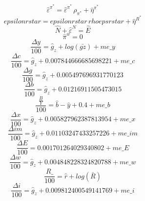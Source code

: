 \begin{dmath}
{\hat{\varepsilon}^{\pi^*}}={\hat{\varepsilon}^{\pi^*}}\, {{\rho_{\pi^*}}}+{\hat{\eta}^{\pi^*}}
\end{dmath}
\begin{dmath}
{epsilonrstar}={epsilonrstar}\, {rhoepsrstar}+{\hat{\eta}^{R^*}}
\end{dmath}
\begin{dmath}
{\hat{N}}+{\hat{\varepsilon}^N}={\hat{E}}
\end{dmath}
\begin{dmath}
{\hat{\pi}^w}=0
\end{dmath}
\begin{dmath}
\frac{{\Delta{y}}}{100}={{\hat{g}_z}}+log\left({\bar{gz}}\right)+{me\_y}
\end{dmath}
\begin{dmath}
\frac{{\Delta{c}}}{100}={{\hat{g}_z}}+0.007844666685698221+{me\_c}
\end{dmath}
\begin{dmath}
\frac{{\Delta{g}}}{100}={{\hat{g}_z}}+0.005497696931770123
\end{dmath}
\begin{dmath}
\frac{{\Delta{b}}}{100}={{\hat{g}_z}}+0.01216911505473015
\end{dmath}
\begin{dmath}
\frac{{\frac{B}{Y}}}{100}={\hat{b}}-{\hat{y}}+0.4+{me\_b}
\end{dmath}
\begin{dmath}
\frac{{\Delta{x}}}{100}={{\hat{g}_z}}+0.005827962387813954+{me\_x}
\end{dmath}
\begin{dmath}
\frac{{\Delta{im}}}{100}={{\hat{g}_z}}+0.01103247433257226+{me\_im}
\end{dmath}
\begin{dmath}
\frac{{\Delta{E}}}{100}=0.001701264029340802+{me\_E}
\end{dmath}
\begin{dmath}
\frac{{\Delta{w}}}{100}={{\hat{g}_z}}+0.004848228324820788+{me\_w}
\end{dmath}
\begin{dmath}
\frac{{R\_}}{100}={\hat{r}}+log\left({\bar{R}}\right)
\end{dmath}
\begin{dmath}
\frac{{\Delta{i}}}{100}={{\hat{g}_z}}+0.009812400549141769+{me\_i}
\end{dmath}
